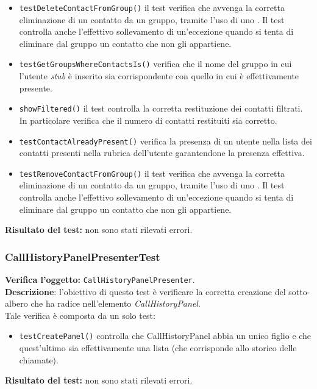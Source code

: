 \begin{itemize}
\item \texttt{testDeleteContactFromGroup()} il test verifica che avvenga la corretta eliminazione di un contatto da un gruppo, tramite l'uso di uno . Il test controlla anche l'effettivo sollevamento di un'eccezione quando si tenta di eliminare dal gruppo un contatto che non gli appartiene.
\item \texttt{testGetGroupsWhereContactsIs()} verifica che il nome del gruppo in cui l'utente \textit{stub} è inserito sia corrispondente con quello in cui è effettivamente presente.
\item \texttt{showFiltered()} il test controlla la corretta restituzione dei contatti filtrati. In particolare verifica che il numero di contatti restituiti sia corretto.
\item \texttt{testContactAlreadyPresent()} verifica la presenza di un utente nella lista dei contatti presenti nella rubrica dell'utente garantendone la presenza effettiva.
\item \texttt{testRemoveContactFromGroup()} il test verifica che avvenga la corretta eliminazione di un contatto da un gruppo, tramite l'uso di uno . Il test controlla anche l'effettivo sollevamento di un'eccezione quando si tenta di eliminare dal gruppo un contatto che non gli appartiene.
\end{itemize}
\textbf{Risultato del test:} non sono stati rilevati errori.

\subsubsection{CallHistoryPanelPresenterTest}
\textbf{Verifica l'oggetto:} \texttt{CallHistoryPanelPresenter}.\\
\textbf{Descrizione}: l'obiettivo di questo test è verificare la corretta creazione del sotto-albero che ha radice nell'elemento \textit{CallHistoryPanel}.\\
Tale verifica è composta da un solo test:
\begin{itemize}
\item \texttt{testCreatePanel()} controlla che CallHistoryPanel abbia un unico figlio e che quest'ultimo sia effettivamente una lista (che corrisponde allo storico delle chiamate).
\end{itemize}
\textbf{Risultato del test:} non sono stati rilevati errori.

